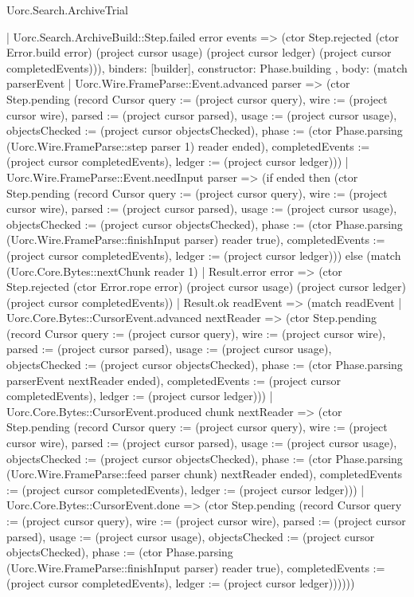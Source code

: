 \begin{lexlean}{Uorc.Search.ArchiveTrial}
\begin{semanticmodule}
{{{          | Uorc.Search.ArchiveBuild::Step.failed error events => (ctor Step.rejected (ctor Error.build error) (project cursor usage) (project cursor ledger) (project cursor completedEvents))),
        binders: [builder],
        constructor: Phase.building
      },
      {
        body: (match parserEvent
          | Uorc.Wire.FrameParse::Event.advanced parser => (ctor Step.pending (record Cursor {query := (project cursor query), wire := (project cursor wire), parsed := (project cursor parsed), usage := (project cursor usage), objectsChecked := (project cursor objectsChecked), phase := (ctor Phase.parsing (Uorc.Wire.FrameParse::step parser 1) reader ended), completedEvents := (project cursor completedEvents), ledger := (project cursor ledger)}))
          | Uorc.Wire.FrameParse::Event.needInput parser => (if ended then (ctor Step.pending (record Cursor {query := (project cursor query), wire := (project cursor wire), parsed := (project cursor parsed), usage := (project cursor usage), objectsChecked := (project cursor objectsChecked), phase := (ctor Phase.parsing (Uorc.Wire.FrameParse::finishInput parser) reader true), completedEvents := (project cursor completedEvents), ledger := (project cursor ledger)})) else (match (Uorc.Core.Bytes::nextChunk reader 1)
            | Result.error error => (ctor Step.rejected (ctor Error.rope error) (project cursor usage) (project cursor ledger) (project cursor completedEvents))
            | Result.ok readEvent => (match readEvent
              | Uorc.Core.Bytes::CursorEvent.advanced nextReader => (ctor Step.pending (record Cursor {query := (project cursor query), wire := (project cursor wire), parsed := (project cursor parsed), usage := (project cursor usage), objectsChecked := (project cursor objectsChecked), phase := (ctor Phase.parsing parserEvent nextReader ended), completedEvents := (project cursor completedEvents), ledger := (project cursor ledger)}))
              | Uorc.Core.Bytes::CursorEvent.produced chunk nextReader => (ctor Step.pending (record Cursor {query := (project cursor query), wire := (project cursor wire), parsed := (project cursor parsed), usage := (project cursor usage), objectsChecked := (project cursor objectsChecked), phase := (ctor Phase.parsing (Uorc.Wire.FrameParse::feed parser chunk) nextReader ended), completedEvents := (project cursor completedEvents), ledger := (project cursor ledger)}))
              | Uorc.Core.Bytes::CursorEvent.done => (ctor Step.pending (record Cursor {query := (project cursor query), wire := (project cursor wire), parsed := (project cursor parsed), usage := (project cursor usage), objectsChecked := (project cursor objectsChecked), phase := (ctor Phase.parsing (Uorc.Wire.FrameParse::finishInput parser) reader true), completedEvents := (project cursor completedEvents), ledger := (project cursor ledger)})))))
}}}
\end{semanticmodule}
\end{lexlean}

